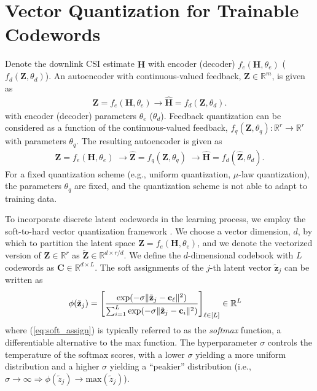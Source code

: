 \section{Vector Quantization for Trainable Codewords}
Denote the downlink CSI estimate $\mathbf{\hat{H}}$ 
with encoder (decoder) $f_{e}(\mathbf H, \theta_e)$ ($f_{d}(\mathbf Z, \theta_d)$).
An autoencoder with continuous-valued feedback, $\mathbf Z \in \mathbb R^{m}$, is given as
\begin{align*}
	\mathbf Z = f_e(\mathbf H, \theta_e) \to
	\hat{\mathbf H} = f_d(\mathbf Z, \theta_d).
\end{align*}
with encoder (decoder) parameters $\theta_e$ ($\theta_d$). Feedback quantization can be considered as a function of the continuous-valued feedback, $f_q(\mathbf Z, \theta_q) : \mathbb R^r \to \mathbb R^r$ with parameters $\theta_q$. The resulting autoencoder is given as
\begin{align*}
	\mathbf Z = f_e(\mathbf H, \theta_e)\; \to
	\hat{\mathbf Z} = f_q(\mathbf Z, \theta_q)\; \to
	\hat{\mathbf H} = f_d(\hat{\mathbf Z}, \theta_d).
\end{align*}
For a fixed quantization scheme (e.g., uniform quantization, $\mu$-law quantization), the parameters $\theta_q$ are fixed, and the quantization scheme is not able to adapt to training data.

To incorporate discrete latent codewords in the learning process, we employ the soft-to-hard vector quantization framework \cite{ref:Agustsson2017SoftToHard}. We choose a vector dimension, $d$, by which to partition the latent space $\mathbf Z = f_e(\mathbf H, \theta_e)$, and we denote the vectorized version of $\mathbf Z \in \mathbb R^{r}$ as $\tilde{\mathbf Z} \in \mathbb R^{d \times r/d}$. We define the $d$-dimensional codebook with $L$ codewords as $\mathbf C \in \mathbb R^{d \times L}$. The soft assignments of the $j$-th latent vector $\tilde{\mathbf z}_j$ can be written as
\begin{align}
\phi(\tilde{\mathbf z}_j) &= \left[\frac{\text{exp}(-\sigma \Arrowvert \tilde{\mathbf z}_j - \mathbf c_\ell\Arrowvert^2)}{\sum_{i=1}^L\text{exp}(-\sigma \Arrowvert \tilde{\mathbf z}_j - \mathbf c_i\Arrowvert^2)}\right]_{\ell\in [L]} \in \mathbb R^L \label{eq:soft_assign}
\end{align}
where (\ref{eq:soft_assign}) is typically referred to as the \emph{softmax} function, a differentiable alternative to the max function. The hyperparameter $\sigma$ controls the temperature of the softmax scores, with a lower $\sigma$ yielding a more uniform distribution and a higher $\sigma$ yielding a ``peakier'' distribution (i.e., $\sigma \to \infty \Rightarrow \phi(\tilde z_j) \to \text{max}(\tilde z_j)$).

